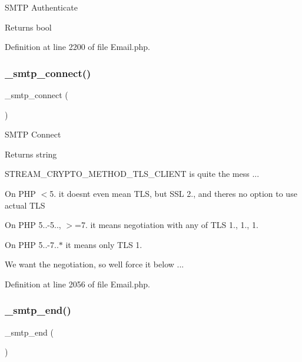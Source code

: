 S\+M\+TP Authenticate

\begin{DoxyReturn}{Returns}
bool 
\end{DoxyReturn}


Definition at line 2200 of file Email.\+php.

\mbox{\label{class_c_i___email_ae57fde4883dcd1dec9f8999efef13f06}} 
\subsubsection{\texorpdfstring{\_smtp\_connect()}{\_smtp\_connect()}}
{\footnotesize\ttfamily \+\_\+smtp\+\_\+connect (\begin{DoxyParamCaption}{ }\end{DoxyParamCaption})\hspace{0.3cm}{\ttfamily [protected]}}

S\+M\+TP Connect

\begin{DoxyReturn}{Returns}
string 
\end{DoxyReturn}
S\+T\+R\+E\+A\+M\+\_\+\+C\+R\+Y\+P\+T\+O\+\_\+\+M\+E\+T\+H\+O\+D\+\_\+\+T\+L\+S\+\_\+\+C\+L\+I\+E\+NT is quite the mess ...


\begin{DoxyItemize}
\item On P\+HP $<$5. it doesn\textquotesingle{}t even mean T\+LS, but S\+SL 2., and there\textquotesingle{}s no option to use actual T\+LS
\item On P\+HP 5..-\/5.., $>$=7. it means negotiation with any of T\+LS 1., 1., 1.
\item On P\+HP 5..-\/7..$\ast$ it means only T\+LS 1.
\end{DoxyItemize}

We want the negotiation, so we\textquotesingle{}ll force it below ...

Definition at line 2056 of file Email.\+php.

\mbox{\label{class_c_i___email_a275593e37ea7d04035b5ce80d8934a13}} 
\subsubsection{\texorpdfstring{\_smtp\_end()}{\_smtp\_end()}}
{\footnotesize\ttfamily \+\_\+smtp\+\_\+end (\begin{DoxyParamCaption}{ }\end{DoxyParamCaption})\hspace{0.3cm}{\ttfamily [protected]}}

